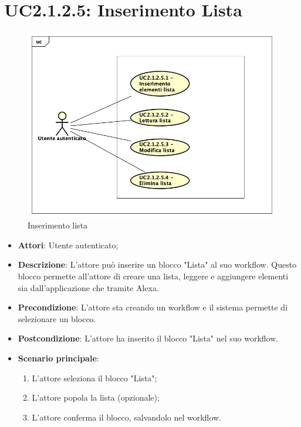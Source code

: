\section{UC2.1.2.5: Inserimento Lista}
\label{UC2.1.2.5}
\begin{figure}[h]
	\centering
	\includegraphics[scale=0.5]{Diagram/Lista.png}
	\caption{Inserimento lista}\label{}
\end{figure}
\begin{itemize}
	\item \textbf{Attori}: Utente autenticato;
	\item \textbf{Descrizione}: L'attore può inserire un blocco "Lista" al suo workflow. Questo blocco permette all'attore di creare una lista, leggere e aggiungere elementi sia dall'applicazione che tramite Alexa.
	\item \textbf{Precondizione}: L'attore sta creando un workflow e il sistema permette di selezionare un blocco.
	\item \textbf{Postcondizione}: L'attore ha inserito il blocco "Lista" nel suo workflow.
	\item \textbf{Scenario principale}:
	\begin{enumerate} \item L'attore seleziona il blocco "Lista";  \item  L'attore popola la lista (opzionale); \item L'attore conferma il blocco, salvandolo nel workflow.\end{enumerate}
\end{itemize}

